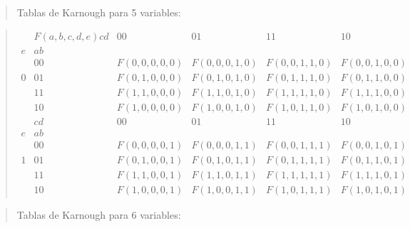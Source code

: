 \begin{quote}
Tablas de Karnough para 5 variables:
\end{quote}

\begin{quote}
\[\begin{matrix}
 & {F{({a,b,c,d,e})}\mathit{cd}} & 00 & 01 & 11 & 10 \\
e & \mathit{ab} & & & & \\
 & 00 & {F{({0,0,0,0,0})}} & {F{({0,0,0,1,0})}} & {F{({0,0,1,1,0})}} & {F{({0,0,1,0,0})}} \\
0 & 01 & {F{({0,1,0,0,0})}} & {F{({0,1,0,1,0})}} & {F{({0,1,1,1,0})}} & {F{({0,1,1,0,0})}} \\
 & 11 & {F{({1,1,0,0,0})}} & {F{({1,1,0,1,0})}} & {F{({1,1,1,1,0})}} & {F{({1,1,1,0,0})}} \\
 & 10 & {F{({1,0,0,0,0})}} & {F{({1,0,0,1,0})}} & {F{({1,0,1,1,0})}} & {F{({1,0,1,0,0})}} \\
 & {\mathit{cd}} & 00 & 01 & 11 & 10 \\
e & \mathit{ab} & & & & \\
 & 00 & {F{({0,0,0,0,1})}} & {F{({0,0,0,1,1})}} & {F{({0,0,1,1,1})}} & {F{({0,0,1,0,1})}} \\
1 & 01 & {F{({0,1,0,0,1})}} & {F{({0,1,0,1,1})}} & {F{({0,1,1,1,1})}} & {F{({0,1,1,0,1})}} \\
 & 11 & {F{({1,1,0,0,1})}} & {F{({1,1,0,1,1})}} & {F{({1,1,1,1,1})}} & {F{({1,1,1,0,1})}} \\
 & 10 & {F{({1,0,0,0,1})}} & {F{({1,0,0,1,1})}} & {F{({1,0,1,1,1})}} & {F{({1,0,1,0,1})}}
\end{matrix}\]
\end{quote}

\begin{quote}
Tablas de Karnough para 6 variables:
\end{quote}

